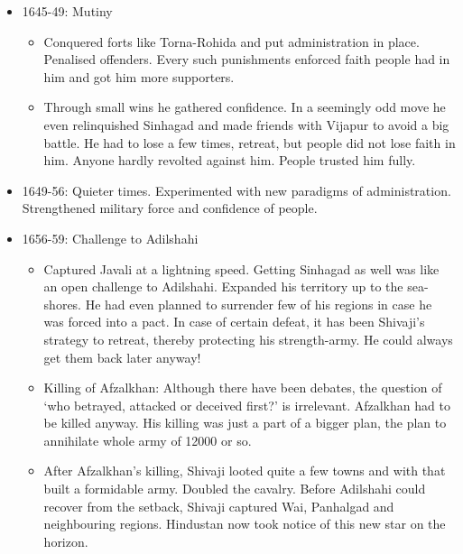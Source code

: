 \begin{itemize}[noitemsep,nolistsep]
\item 1645-49: Mutiny
	\begin{itemize}[noitemsep,nolistsep]
	\item Conquered forts like Torna-Rohida and put administration in place. Penalised offenders. Every such punishments enforced faith people had in him and got him more supporters.
	\item Through small wins he gathered confidence. In a seemingly odd move he even relinquished Sinhagad and made friends with Vijapur to avoid a big battle. He had to lose a few times, retreat, but people did not lose faith in him. Anyone hardly revolted against him. People trusted him fully.
	\end{itemize}

\item 1649-56: Quieter times. Experimented with new paradigms of administration. Strengthened military force and confidence of people.

\item 1656-59: Challenge to Adilshahi
	\begin{itemize}[noitemsep,nolistsep]
	\item Captured  Javali at a lightning speed.  Getting Sinhagad as well was like an open challenge to Adilshahi. Expanded his territory up to the sea-shores. He had even planned to surrender few of his regions in case he was forced into a pact. In case of certain defeat, it has been Shivaji’s strategy to retreat, thereby protecting his strength-army. He could always get them back later anyway!
	\item Killing of Afzalkhan: Although there have been debates, the question of ‘who betrayed, attacked or deceived first?’ is irrelevant. Afzalkhan had to be killed anyway. His killing was just a part of a bigger plan, the plan to annihilate whole army of 12000 or so.
	\item After Afzalkhan’s killing, Shivaji looted quite a few towns and with that built a formidable army. Doubled the cavalry. Before Adilshahi could recover from the setback, Shivaji captured Wai, Panhalgad and neighbouring regions. Hindustan now took notice of this new star on the horizon.
	\end{itemize}


\end{itemize}
